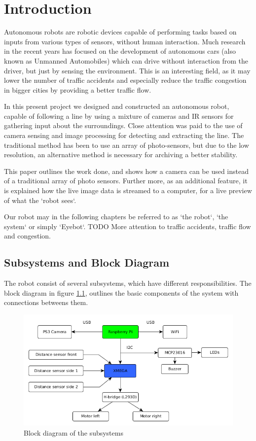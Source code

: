 \chapter{Introduction}

Autonomous robots are robotic devices capable of performing tasks based on inputs from various types of sensors, without human interaction. Much research in the recent years has focused on the development of autonomous cars (also known as Unmanned Automobiles) which can drive without interaction from the driver, but just by sensing the environment. This is an interesting field, as it may lower the number of traffic accidents and especially reduce the traffic congestion in bigger cities by providing a better traffic flow.

In this present project we designed and constructed an autonomous robot, capable of following a line by using a mixture of cameras and IR sensors for gathering input about the surroundings. Close attention was paid to the use of camera sensing and image processing for detecting and extracting the line. The traditional method has been to use an array of photo-sensors, but due to the low resolution, an alternative method is necessary for archiving a better stability.

This paper outlines the work done, and shows how a camera can be used instead of a traditional array of photo sensors. Further more, as an additional feature, it is explained how the live image data is streamed to a computer, for a live preview of what the `robot sees`.

Our robot may in the following chapters be referred to as `the robot`, `the system` or simply `Eyebot`.
TODO More attention to traffic accidents, traffic flow and congestion.

%
%
%
%
\section{Subsystems and Block Diagram}

The robot consist of several subsystems, which have different responsibilities. The block diagram in figure \ref{fig:intro_1}, outlines the basic components of the system with connections betweens them. 

\begin{figure}[!ht]
	\centering
	\includegraphics[width=1\textwidth]{resources/Blockdiagram}
	\caption{Block diagram of the subsystems}
	\label{fig:intro_1}
\end{figure}

